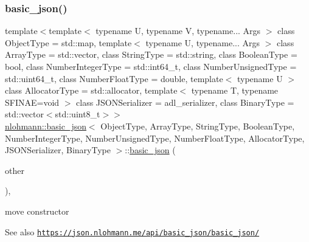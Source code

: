 \subsubsection{\texorpdfstring{basic\+\_\+json()}{basic\_json()}\hspace{0.1cm}{\footnotesize\ttfamily [9/9]}}
{\footnotesize\ttfamily template$<$template$<$ typename U, typename V, typename... Args $>$ class Object\+Type = std\+::map, template$<$ typename U, typename... Args $>$ class Array\+Type = std\+::vector, class String\+Type  = std\+::string, class Boolean\+Type  = bool, class Number\+Integer\+Type  = std\+::int64\+\_\+t, class Number\+Unsigned\+Type  = std\+::uint64\+\_\+t, class Number\+Float\+Type  = double, template$<$ typename U $>$ class Allocator\+Type = std\+::allocator, template$<$ typename T, typename S\+F\+I\+N\+A\+E=void $>$ class J\+S\+O\+N\+Serializer = adl\+\_\+serializer, class Binary\+Type  = std\+::vector$<$std\+::uint8\+\_\+t$>$$>$ \\
\hyperlink{classnlohmann_1_1basic__json}{nlohmann\+::basic\+\_\+json}$<$ Object\+Type, Array\+Type, String\+Type, Boolean\+Type, Number\+Integer\+Type, Number\+Unsigned\+Type, Number\+Float\+Type, Allocator\+Type, J\+S\+O\+N\+Serializer, Binary\+Type $>$\+::\hyperlink{classnlohmann_1_1basic__json}{basic\+\_\+json} (\begin{DoxyParamCaption}\item[{\hyperlink{classnlohmann_1_1basic__json}{basic\+\_\+json}$<$ Object\+Type, Array\+Type, String\+Type, Boolean\+Type, Number\+Integer\+Type, Number\+Unsigned\+Type, Number\+Float\+Type, Allocator\+Type, J\+S\+O\+N\+Serializer, Binary\+Type $>$ \&\&}]{other }\end{DoxyParamCaption})\hspace{0.3cm}{\ttfamily [inline]}, {\ttfamily [noexcept]}}



move constructor 

\begin{DoxySeeAlso}{See also}
\href{https://json.nlohmann.me/api/basic_json/basic_json/}{\tt https\+://json.\+nlohmann.\+me/api/basic\+\_\+json/basic\+\_\+json/} 
\end{DoxySeeAlso}
\mbox{\label{classnlohmann_1_1basic__json_a60b643c02a19fa52f99db8215ff58e0f}} 
